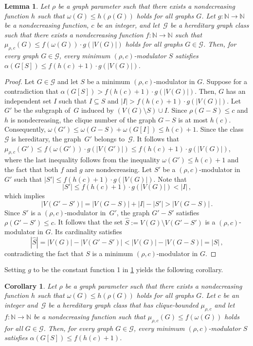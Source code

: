 \documentclass[11pt]{article}
\newcommand{\rhocm}{\mu_{\rho,c}}
\theoremstyle{plain}
\newtheorem{lemma}[theorem]{Lemma}
\newtheorem{corollary}[theorem]{Corollary}
\theoremstyle{definition}
\theoremstyle{remark}
\numberwithin{equation}{section}
\begin{document}
\begin{lemma}\label{lem:tau-k-omega-alpha-general}
    Let $\rho$ be a graph parameter such that there exists a nondecreasing function $h$ such that $\omega(G) \le h(\rho(G))$ holds for all graphs $G$.
    Let $g : \mathbb{N} \rightarrow \mathbb{N}$ be a nondecreasing function, $c$ be an integer, and let~$\mathcal{G}$ be a hereditary graph class such that there exists a nondecreasing function $f \colon \mathbb{N} \rightarrow \mathbb{N}$ such that $\rhocm(G)\le f(\omega(G))\cdot g(|V(G)|)$ holds for all graphs $G\in \mathcal{G}$.
    Then, for every graph $G\in \mathcal{G}$, every minimum $(\rho, c)$-modulator $S$ satisfies $\alpha(G[S])\le f(h(c)+1)\cdot g(|V(G)|)$.
\end{lemma}
\begin{proof}
    Let $G\in \mathcal{G}$ and let $S$ be a minimum $(\rho,c)$-modulator in $G$.
    Suppose for a contradiction that $\alpha(G[S])> f(h(c)+1) \cdot g(|V(G)|)$.
    Then, $G$ has an independent set $I$ such that $I\subseteq S$ and $|I|>f(h(c)+1) \cdot g(|V(G)|)$.
    Let~$G'$ be the subgraph of~$G$ induced by $(V(G)\setminus S)\cup I$.
    Since $\rho(G-S)\le c$ and $h$ is nondecreasing, the clique number of the graph $G-S$ is at most $h(c)$.
    Consequently, $\omega(G')\le \omega(G-S) + \omega(G[I])\le h(c)+1$.
    Since the class~$\mathcal{G}$ is hereditary, the graph~$G'$ belongs to~$\mathcal{G}$. 
    It follows that $\rhocm(G')\le f(\omega(G')) \cdot g(|V(G')|) \le f(h(c)+1) \cdot g(|V(G)|)$, where the last inequality follows from the inequality $\omega(G')\le h(c)+1$ and the fact that both $f$ and $g$ are nondecreasing.
    Let $S'$ be a $(\rho, c)$-modulator in~$G'$ such that $|S'|\le f(h(c)+1) \cdot g(|V(G)|)$.
    Note that 
    \[
        |S'|\le f(h(c)+1) \cdot g(|V(G)|)<|I|\,,
    \] 
    which implies 
    \[
        |V(G'-S')| = |V(G-S)|+|I|-|S'| > |V(G-S)|\,.
    \]
    Since $S'$ is a $(\rho, c)$-modulator in~$G'$, the graph $G'-S'$ satisfies $\rho(G'-S')\le c$.
    It follows that the set $\widehat{S}:= V(G)\setminus V(G'-S')$ is a $(\rho, c)$-modulator in $G$.
    Its cardinality satisfies
    \[
        |\widehat{S}| = |V(G)|-|V(G'-S')| < |V(G)|-|V(G-S)| = |S|\,,
    \]
    contradicting the fact that $S$ is a minimum $(\rho,c)$-modulator in $G$.
\end{proof}

Setting $g$ to be the constant function 1 in \cref{lem:tau-k-omega-alpha-general} yields the following corollary.

\begin{corollary}\label{lem:tau-k-omega-alpha}
Let $\rho$ be a graph parameter such that there exists a nondecreasing function $h$ such that $\omega(G) \le h(\rho(G))$ holds for all graphs $G$.
Let $c$ be an integer and~$\mathcal{G}$ be a hereditary graph class that has clique-bounded $\rhocm$ and let $f : \mathbb{N} \rightarrow \mathbb{N}$ be a nondecreasing function such that $\rhocm(G)\le f(\omega(G))$ holds for all $G\in \mathcal{G}$.
Then, for every graph $G\in \mathcal{G}$, every minimum $(\rho, c)$-modulator $S$ satisfies $\alpha(G[S])\le f(h(c)+1)$.
\end{corollary}
\end{document}
